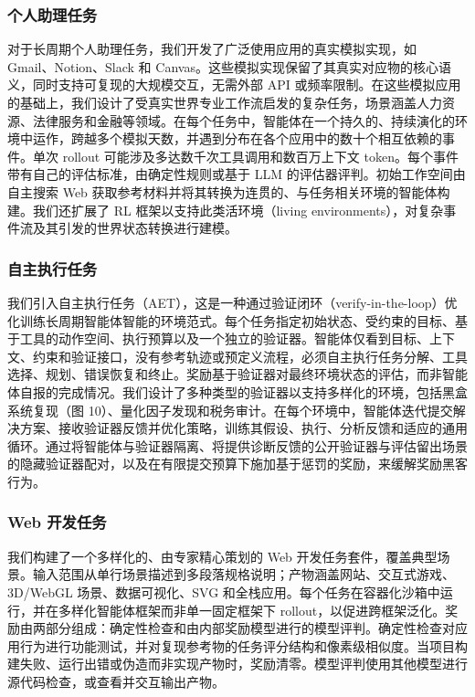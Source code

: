 \documentclass[
  10
]{article}
\begin{document}
\subsubsection{个人助理任务}\label{personal-assistant-tasks}

对于长周期个人助理任务，我们开发了广泛使用应用的真实模拟实现，如 Gmail、Notion、Slack 和 Canvas。这些模拟实现保留了其真实对应物的核心语义，同时支持可复现的大规模交互，无需外部 API 或频率限制。在这些模拟应用的基础上，我们设计了受真实世界专业工作流启发的复杂任务，场景涵盖人力资源、法律服务和金融等领域。在每个任务中，智能体在一个持久的、持续演化的环境中运作，跨越多个模拟天数，并遇到分布在各个应用中的数十个相互依赖的事件。单次 rollout 可能涉及多达数千次工具调用和数百万上下文 token。每个事件带有自己的评估标准，由确定性规则或基于 LLM 的评估器评判。初始工作空间由自主搜索 Web 获取参考材料并将其转换为连贯的、与任务相关环境的智能体构建。我们还扩展了 RL 框架以支持此类活环境（living environments），对复杂事件流及其引发的世界状态转换进行建模。

\subsubsection{自主执行任务}\label{autonomous-execution-tasks}

我们引入自主执行任务（AET），这是一种通过验证闭环（verify-in-the-loop）优化训练长周期智能体智能的环境范式。每个任务指定初始状态、受约束的目标、基于工具的动作空间、执行预算以及一个独立的验证器。智能体仅看到目标、上下文、约束和验证接口，没有参考轨迹或预定义流程，必须自主执行任务分解、工具选择、规划、错误恢复和终止。奖励基于验证器对最终环境状态的评估，而非智能体自报的完成情况。我们设计了多种类型的验证器以支持多样化的环境，包括黑盒系统复现（图 10）、量化因子发现和税务审计。在每个环境中，智能体迭代提交解决方案、接收验证器反馈并优化策略，训练其假设、执行、分析反馈和适应的通用循环。通过将智能体与验证器隔离、将提供诊断反馈的公开验证器与评估留出场景的隐藏验证器配对，以及在有限提交预算下施加基于惩罚的奖励，来缓解奖励黑客行为。

\subsubsection{Web 开发任务}\label{web-development-tasks}

我们构建了一个多样化的、由专家精心策划的 Web 开发任务套件，覆盖典型场景。输入范围从单行场景描述到多段落规格说明；产物涵盖网站、交互式游戏、3D/WebGL 场景、数据可视化、SVG 和全栈应用。每个任务在容器化沙箱中运行，并在多样化智能体框架而非单一固定框架下 rollout，以促进跨框架泛化。奖励由两部分组成：确定性检查和由内部奖励模型进行的模型评判。确定性检查对应用行为进行功能测试，并对复现参考物的任务评分结构和像素级相似度。当项目构建失败、运行出错或伪造而非实现产物时，奖励清零。模型评判使用其他模型进行源代码检查，或查看并交互输出产物。
\end{document}
